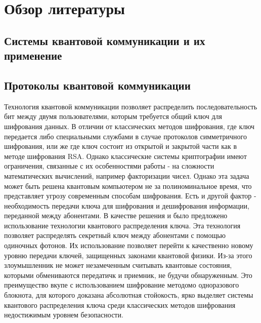 \chapter{Обзор литературы}\label{ch:ch1}

\section{Системы квантовой коммуникации и их применение}\label{sec:ch1/sec1}

\section{Протоколы квантовой коммуникации}\label{sec:ch1/sect2}
Технология квантовой коммуникации позволяет распределить последовательность бит между двумя пользователями,  которым требуется общий ключ для шифрования данных. В отличии от классических методов шифрования, где ключ передается либо специальными службами в случае протоколов симметричного шифрования, или же где ключ состоит из открытой и закрытой части как в методе шифрования RSA. Однако классические системы криптографии имеют ограничения, связанные с их особенностями работы - на сложности математических  вычислений, например факторизации чисел. Однако эта задача может быть решена квантовым компьютером не за полиноминальное время, что представляет угрозу современным способам шифрования.  Есть и другой фактор - необходимость передачи ключа для шифрования и дешифрования информации, переданной между абонентами. 
В качестве решения и было предложено использование технологии квантового распределения ключа. Эта технология позволяет распределять секретный ключ между абонентами с помощью одиночных фотонов. Их использование позволяет перейти к качественно новому уровню передачи ключей, защищенных законами квантовой физики. Из-за этого злоумышленник не может незамеченным считывать квантовые состояния, которыми обмениваются передатичк и приемник, не будучи обнаруженным. Это преимущество вкупе с использованием шифрование методомо одноразового блокнота, для которого доказана абсолютная стойокость, ярко выделяет системы квантового распределения ключа среди классических методов шифрования недостижимым уровнем безопасности. 


